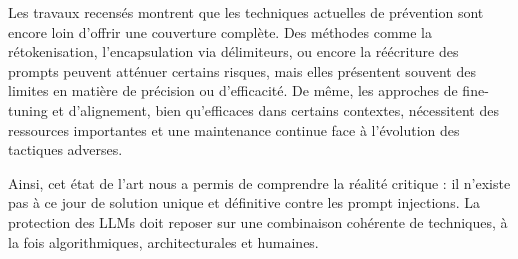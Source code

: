 	Les travaux recensés montrent que les techniques actuelles de prévention sont encore loin d’offrir une couverture complète. Des méthodes comme la rétokenisation, l’encapsulation via délimiteurs, ou encore la réécriture des prompts peuvent atténuer certains risques, mais elles présentent souvent des limites en matière de précision ou d’efficacité. De même, les approches de fine-tuning et d’alignement, bien qu’efficaces dans certains contextes, nécessitent des ressources importantes et une maintenance continue face à l’évolution des tactiques adverses.
	
	Ainsi, cet état de l’art nous a permis de comprendre la réalité critique : il n’existe pas à ce jour de solution unique et définitive contre les prompt injections. La protection des LLMs doit reposer sur une combinaison cohérente de techniques, à la fois algorithmiques, architecturales et humaines.